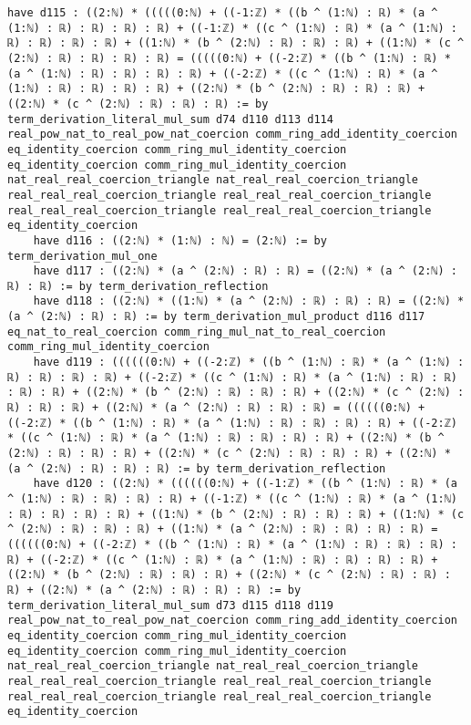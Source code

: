 \documentclass{article}
\begin{document}
\begin{tcolorbox}[colback=white!10, width=\linewidth]
\begin{lstlisting}[language=Lean4]
    have d115 : ((2:ℕ) * (((((0:ℕ) + ((-1:ℤ) * ((b ^ (1:ℕ) : ℝ) * (a ^ (1:ℕ) : ℝ) : ℝ) : ℝ) : ℝ) + ((-1:ℤ) * ((c ^ (1:ℕ) : ℝ) * (a ^ (1:ℕ) : ℝ) : ℝ) : ℝ) : ℝ) + ((1:ℕ) * (b ^ (2:ℕ) : ℝ) : ℝ) : ℝ) + ((1:ℕ) * (c ^ (2:ℕ) : ℝ) : ℝ) : ℝ) : ℝ) = (((((0:ℕ) + ((-2:ℤ) * ((b ^ (1:ℕ) : ℝ) * (a ^ (1:ℕ) : ℝ) : ℝ) : ℝ) : ℝ) + ((-2:ℤ) * ((c ^ (1:ℕ) : ℝ) * (a ^ (1:ℕ) : ℝ) : ℝ) : ℝ) : ℝ) + ((2:ℕ) * (b ^ (2:ℕ) : ℝ) : ℝ) : ℝ) + ((2:ℕ) * (c ^ (2:ℕ) : ℝ) : ℝ) : ℝ) := by term_derivation_literal_mul_sum d74 d110 d113 d114 real_pow_nat_to_real_pow_nat_coercion comm_ring_add_identity_coercion eq_identity_coercion comm_ring_mul_identity_coercion eq_identity_coercion comm_ring_mul_identity_coercion nat_real_real_coercion_triangle nat_real_real_coercion_triangle real_real_real_coercion_triangle real_real_real_coercion_triangle real_real_real_coercion_triangle real_real_real_coercion_triangle eq_identity_coercion
    have d116 : ((2:ℕ) * (1:ℕ) : ℕ) = (2:ℕ) := by term_derivation_mul_one
    have d117 : ((2:ℕ) * (a ^ (2:ℕ) : ℝ) : ℝ) = ((2:ℕ) * (a ^ (2:ℕ) : ℝ) : ℝ) := by term_derivation_reflection
    have d118 : ((2:ℕ) * ((1:ℕ) * (a ^ (2:ℕ) : ℝ) : ℝ) : ℝ) = ((2:ℕ) * (a ^ (2:ℕ) : ℝ) : ℝ) := by term_derivation_mul_product d116 d117 eq_nat_to_real_coercion comm_ring_mul_nat_to_real_coercion comm_ring_mul_identity_coercion
    have d119 : ((((((0:ℕ) + ((-2:ℤ) * ((b ^ (1:ℕ) : ℝ) * (a ^ (1:ℕ) : ℝ) : ℝ) : ℝ) : ℝ) + ((-2:ℤ) * ((c ^ (1:ℕ) : ℝ) * (a ^ (1:ℕ) : ℝ) : ℝ) : ℝ) : ℝ) + ((2:ℕ) * (b ^ (2:ℕ) : ℝ) : ℝ) : ℝ) + ((2:ℕ) * (c ^ (2:ℕ) : ℝ) : ℝ) : ℝ) + ((2:ℕ) * (a ^ (2:ℕ) : ℝ) : ℝ) : ℝ) = ((((((0:ℕ) + ((-2:ℤ) * ((b ^ (1:ℕ) : ℝ) * (a ^ (1:ℕ) : ℝ) : ℝ) : ℝ) : ℝ) + ((-2:ℤ) * ((c ^ (1:ℕ) : ℝ) * (a ^ (1:ℕ) : ℝ) : ℝ) : ℝ) : ℝ) + ((2:ℕ) * (b ^ (2:ℕ) : ℝ) : ℝ) : ℝ) + ((2:ℕ) * (c ^ (2:ℕ) : ℝ) : ℝ) : ℝ) + ((2:ℕ) * (a ^ (2:ℕ) : ℝ) : ℝ) : ℝ) := by term_derivation_reflection
    have d120 : ((2:ℕ) * ((((((0:ℕ) + ((-1:ℤ) * ((b ^ (1:ℕ) : ℝ) * (a ^ (1:ℕ) : ℝ) : ℝ) : ℝ) : ℝ) + ((-1:ℤ) * ((c ^ (1:ℕ) : ℝ) * (a ^ (1:ℕ) : ℝ) : ℝ) : ℝ) : ℝ) + ((1:ℕ) * (b ^ (2:ℕ) : ℝ) : ℝ) : ℝ) + ((1:ℕ) * (c ^ (2:ℕ) : ℝ) : ℝ) : ℝ) + ((1:ℕ) * (a ^ (2:ℕ) : ℝ) : ℝ) : ℝ) : ℝ) = ((((((0:ℕ) + ((-2:ℤ) * ((b ^ (1:ℕ) : ℝ) * (a ^ (1:ℕ) : ℝ) : ℝ) : ℝ) : ℝ) + ((-2:ℤ) * ((c ^ (1:ℕ) : ℝ) * (a ^ (1:ℕ) : ℝ) : ℝ) : ℝ) : ℝ) + ((2:ℕ) * (b ^ (2:ℕ) : ℝ) : ℝ) : ℝ) + ((2:ℕ) * (c ^ (2:ℕ) : ℝ) : ℝ) : ℝ) + ((2:ℕ) * (a ^ (2:ℕ) : ℝ) : ℝ) : ℝ) := by term_derivation_literal_mul_sum d73 d115 d118 d119 real_pow_nat_to_real_pow_nat_coercion comm_ring_add_identity_coercion eq_identity_coercion comm_ring_mul_identity_coercion eq_identity_coercion comm_ring_mul_identity_coercion nat_real_real_coercion_triangle nat_real_real_coercion_triangle real_real_real_coercion_triangle real_real_real_coercion_triangle real_real_real_coercion_triangle real_real_real_coercion_triangle eq_identity_coercion

\end{lstlisting}
\end{tcolorbox}
\end{document}
